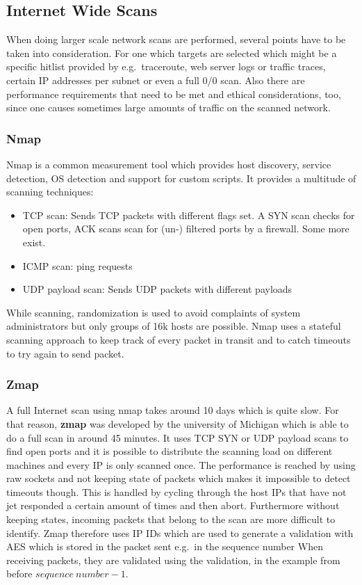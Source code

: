 \subsection{Internet Wide Scans}
When doing larger scale network scans are performed, several points have to be taken into consideration.
For one which targets are selected which might be a specific hitlist provided by e.g.\ traceroute, web server logs or traffic traces, certain IP addresses per subnet or even a full 0/0 scan.
Also there are performance requirements that need to be met and ethical considerations, too, since one causes sometimes large amounts of traffic on the scanned network.\\
\vspace{4pt}

\subsubsection*{Nmap}
Nmap is a common measurement tool which provides host discovery, service detection, OS detection and support for custom scripts.
It provides a multitude of scanning techniques:
\begin{itemize}
  \item TCP scan: Sends TCP packets with different flags set. A SYN scan checks for open ports, ACK scans scan for (un-) filtered ports by a firewall. Some more exist.
  \item ICMP scan: ping requests
  \item UDP payload scan: Sends UDP packets with different payloads
\end{itemize}
While scanning, randomization is used to avoid complaints of system administrators but only groups of 16k hosts are possible.
Nmap uses a stateful scanning approach to keep track of every packet in transit and to catch timeouts to try again to send packet.\\

\subsubsection*{Zmap}
A full Internet scan using nmap takes around 10 days which is quite slow.
For that reason, \textbf{zmap} was developed by the university of Michigan which is able to do a full scan in around 45 minutes.
It uses TCP SYN or UDP payload scans to find open ports and it is possible to distribute the scanning load on different machines and every IP is only scanned once.
The performance is reached by using raw sockets and not keeping state of packets which makes it impossible to detect timeouts though.
This is handled by cycling through the host IPs that have not jet responded a certain amount of times and then abort.
Furthermore without keeping states, incoming packets that belong to the scan are more difficult to identify.
Zmap therefore uses IP IDs which are used to generate a validation with AES which is stored in the packet sent e.g.\ in the sequence number
When receiving packets, they are validated using the validation, in the example from before $sequence~number- 1$.

